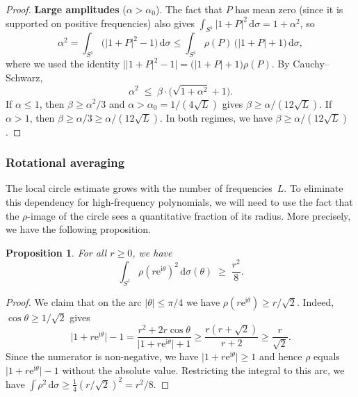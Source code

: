 \documentclass[11pt]{amsart}
\newtheorem{proposition}[theorem]{Proposition}
\theoremstyle{remark}
\begin{document}
\begin{proof}
\medskip
\noindent
\textbf{Large amplitudes} ($\alpha > \alpha_0$).
The fact that $P$ has mean zero (since it is supported on positive frequencies) also gives
$\int_{S^1}\lvert 1+P \rvert^2\,\mathrm{d}\sigma = 1 + \alpha^2$, so
\[
\alpha^2
= \int_{S^1}\bigl(\lvert 1+P \rvert^2 - 1\bigr)\,\mathrm{d}\sigma
\le \int_{S^1} \rho(P)\,\bigl(\lvert 1+P \rvert + 1\bigr)\,\mathrm{d}\sigma,
\]
where we used the identity $\bigl\lvert \lvert 1+P \rvert^2 - 1\bigr\rvert
= \bigl(\lvert 1+P \rvert + 1\bigr)\rho(P)$.  By Cauchy--Schwarz,
\[
\alpha^2 \;\le\; \beta \cdot \bigl(\sqrt{1+\alpha^2} + 1\bigr).
\]
If $\alpha \le 1$, then $\beta \ge \alpha^2/3$ and $\alpha > \alpha_0 = 1/(4\sqrt{L})$ gives
$\beta \ge \alpha/(12\sqrt{L})$.
If $\alpha > 1$, then $\beta \ge \alpha/3 \ge \alpha/(12\sqrt{L})$.
In both regimes, we have $\beta \ge \alpha/(12\sqrt{L})$.
\end{proof}


\subsubsection{Rotational averaging}\label{sec:rot-avg}

The local circle estimate grows with the number of frequencies~$L$.  To
eliminate this dependency for high-frequency polynomials, we will need 
to use the fact that the $\rho$-image of the circle sees a
quantitative fraction of its radius. More precisely, we have the following proposition.

\begin{proposition}\label{prop:rot-avg}
For all $r \ge 0$, we have
\[
\int_{S^1} \rho(r\mathrm{e}^{\mathrm{i}\theta})^2\,\mathrm{d}\sigma(\theta)
\;\ge\; \frac{r^2}{8}.
\]
\end{proposition}

\begin{proof}
We claim that on the arc $\lvert \theta \rvert \le \pi/4$ we have $\rho(r\mathrm{e}^{\mathrm{i}\theta}) \ge r/\sqrt{2}$. Indeed,
$\cos\theta \ge 1/\sqrt{2}$ gives
\[
\lvert 1 + r\mathrm{e}^{\mathrm{i}\theta} \rvert - 1
= \frac{r^2 + 2r\cos\theta}{\lvert 1+r\mathrm{e}^{\mathrm{i}\theta} \rvert + 1}
\ge \frac{r(r + \sqrt{2})}{r + 2}
\ge \frac{r}{\sqrt{2}}.
\]
 Since the numerator
is non-negative, we have $\lvert 1 + r\mathrm{e}^{\mathrm{i}\theta} \rvert \geq 1$ and hence $\rho$ equals
$\lvert 1+r\mathrm{e}^{\mathrm{i}\theta} \rvert - 1$ without the absolute value.  Restricting the
integral to this arc, we have
$\int \rho^2\,\mathrm{d}\sigma \ge \frac{1}{4}(r/\sqrt{2})^2 = r^2/8$.
\end{proof}
\end{document}
